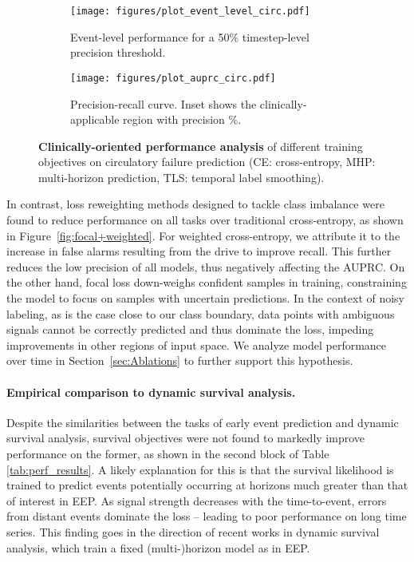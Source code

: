 \documentclass[nohyperref]{article}
\begin{document}
\begin{figure*}[t]
\centering
\begin{subfigure}[b]{0.46\textwidth}
  \centering
  \texttt{[image: figures/plot\_event\_level\_circ.pdf]}
  \caption{\centering Event-level performance for a 50\% timestep-level precision threshold.} \label{fig:event-based}
\end{subfigure}
\begin{subfigure}[b]{0.46\textwidth}
 \centering
  \texttt{[image: figures/plot\_auprc\_circ.pdf]}
  \caption{\centering Precision-recall curve. Inset shows the clinically-applicable region with precision \%.}
  \label{fig:PR_curve}
\end{subfigure}
\caption{\textbf{Clinically-oriented performance analysis} of different training objectives on circulatory failure prediction (CE: cross-entropy, MHP: multi-horizon prediction, TLS: temporal label smoothing).}

\label{fig:clinical_performance_circ}
\end{figure*}

In contrast, loss reweighting methods designed to tackle class imbalance were found to reduce performance on all tasks over traditional cross-entropy, as shown in Figure~\ref{fig:focal+weighted}. For weighted cross-entropy, we attribute it to the increase in false alarms resulting from the drive to improve recall. This further reduces the low precision of all models, thus negatively affecting the AUPRC. On the other hand, focal loss down-weighs confident samples in training, constraining the model to focus on samples with uncertain predictions. In the context of noisy labeling, as is the case close to our class boundary, data points with ambiguous signals cannot be correctly predicted and thus dominate the loss, impeding improvements in other regions of input space. We analyze model performance over time in Section~\ref{sec:Ablations} to further support this hypothesis.


\paragraph{Empirical comparison to dynamic survival analysis.} Despite the similarities between the tasks of early event prediction and dynamic survival analysis, survival objectives were not found to markedly improve performance on the former, as shown in the second block of Table \ref{tab:perf_results}. A likely explanation for this is that the survival likelihood is trained to predict events potentially occurring at horizons much greater than that of interest in EEP. As signal strength decreases with the time-to-event, errors from distant events dominate the loss -- leading to poor performance on long time series. This finding goes in the direction of recent works \cite{jarrett2019dynamic,lee2019dynamic} in dynamic survival analysis, which train a fixed (multi-)horizon model as in EEP. 
\end{document}
